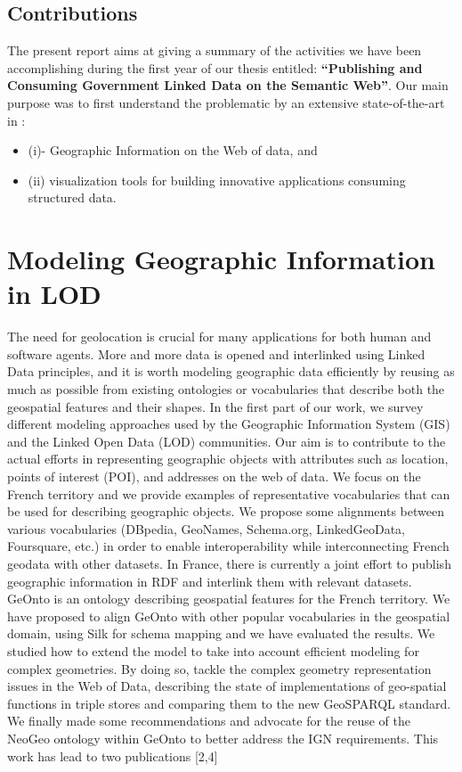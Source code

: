 \documentclass[a4paper,11pt]{report}
\begin{document}
\section{Contributions}
   
The present report aims at giving a summary of the activities we have been accomplishing
during the first year of our thesis entitled: \textbf{``Publishing and Consuming Government Linked Data on the Semantic Web''}. Our main purpose was to first understand the problematic by an extensive state-of-the-art in : 
\begin{itemize}
\item (i)- Geographic Information on the Web of data, and 
\item (ii) visualization tools for building innovative applications consuming structured data. 
\end{itemize}



\chapter{Modeling Geographic Information in LOD} \label{model}

The need for geolocation is crucial for many applications for both human and software agents. More and more data is opened and interlinked using Linked Data principles, and it is worth modeling geographic data efficiently by reusing as much as possible from existing ontologies or vocabularies that describe both the geospatial features and their shapes. In the first part of our work, we survey different modeling approaches used by the Geographic Information System (GIS) and the Linked Open Data (LOD) communities. Our aim is to contribute to the actual efforts in representing geographic objects with attributes such as location, points of interest (POI), and addresses on the web of data. We focus on the French territory and we provide examples of representative vocabularies that can be used for describing geographic objects. We propose some alignments between various vocabularies (DBpedia, GeoNames, Schema.org, LinkedGeoData, Foursquare, etc.) in order to enable interoperability while interconnecting French geodata with other datasets. In France, there is  currently a joint effort to publish geographic information in RDF  and interlink them with relevant datasets. GeOnto is an ontology describing geospatial features for the French territory. We have proposed to align GeOnto with other popular vocabularies in the geospatial domain, using Silk for schema mapping and we have evaluated the results. We studied how to extend the model to take into account efficient modeling for complex geometries. By doing so, tackle the complex geometry representation issues in the Web of Data, describing the state of implementations of geo-spatial functions in triple stores and comparing them to the new GeoSPARQL standard.  We finally made some recommendations and advocate for the reuse of the NeoGeo ontology within GeOnto to better address the IGN requirements.
This work has lead to two publications [2,4]
\end{document}
